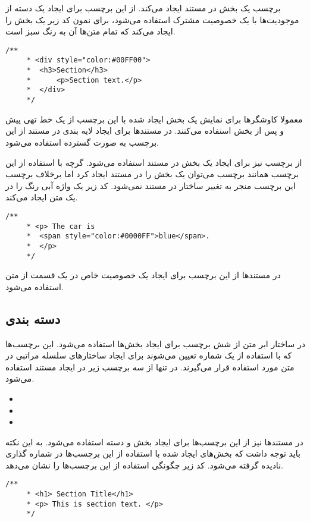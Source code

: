 برچسب  یک بخش در مستند ایجاد می‌کند.  از این برچسب برای ایجاد یک دسته از موجودیت‌ها با یک
خصوصیت مشترک استفاده می‌شود، برای نمون کد زیر یک بخش را ایجاد می‌کند که تمام متن‌ها آن به رنگ سبز
است.
\begin{latin}
\lstset{language=C++}  
\begin{lstlisting}[frame=single] 
    /**
     * <div style="color:#00FF00">
     * 	<h3>Section</h3>
     * 		<p>Section text.</p>
     * 	</div>
     */
\end{lstlisting}
\end{latin}
معمولا کاوشگرها برای نمایش یک بخش ایجاد شده با این برچسب از یک خط تهی پیش و پس از بخش 
استفاده می‌کنند. در مستندها برای ایجاد لایه بندی در مستند از این برچسب به صورت گسترده استفاده
می‌شود.

از برچسب  نیز برای ایجاد یک بخش در مستند استفاده می‌شود. گرچه با استفاده از این برچسب
همانند برچسب  می‌توان یک بخش را در مستند ایجاد کرد اما برخلاف برچسب  این برچسب
منجر به تغییر ساختار در مستند نمی‌شود. کد زیر یک واژه آبی رنگ را در یک متن ایجاد می‌کند.
\begin{latin}
\lstset{language=C++}  
\begin{lstlisting}[frame=single] 
    /**
     * <p> The car is 
     * 	<span style="color:#0000FF">blue</span>.
     * 	</p>
     */
\end{lstlisting}
\end{latin}
در مستندها از این برچسب برای ایجاد یک خصوصیت خاص در یک قسمت از متن استفاده می‌شود.


\subsection{دسته بندی}
در ساختار ابر متن از شش برچسب برای ایجاد بخش‌ها استفاده می‌شود. این برچسب‌ها که با استفاده از
یک شماره تعیین می‌شوند برای ایجاد ساختارهای سلسله مراتبی در متن مورد استفاده قرار می‌گیرند. در
تنها از سه برچسب زیر در ایجاد مستند استفاده می‌شود.
\begin{itemize}
 \item {}
 \item {}
 \item {}
\end{itemize}
در مستندها نیز از این برچسب‌ها برای ایجاد بخش و دسته استفاده می‌شود. به این نکته باید توجه داشت که
بخش‌های ایجاد شده با استفاده از این برچسب‌ها در شماره گذاری نادیده گرفته می‌شود. کد زیر چگونگی 
استفاده از این برچسب‌ها را نشان می‌دهد.
\begin{latin}
\lstset{language=C++}  
\begin{lstlisting}[frame=single] 
    /**
     * <h1> Section Title</h1>
     * <p> This is section text. </p>
     */
\end{lstlisting}
\end{latin}

